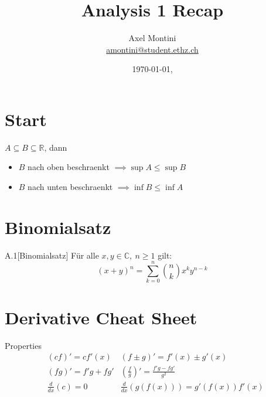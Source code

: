 \documentclass[8pt,a4paper,twocolumn,table]{extarticle}
\title{Analysis 1 Recap}
\author{Axel Montini \\ \href{mailto:amontini@student.ethz.ch}{amontini@student.ethz.ch}}
\date{\today \hfill \texttt{\branch}, \texttt{\commit}}
\newcommand{\R}{\mathbb{R}}
\newcommand{\C}{\mathbb{C}}
\begin{document}
\maketitle

\section{Start}

\begin{korollar}{1.16}
    \label{korollar:inf-sup}
    $A \subseteq B \subseteq \R$, dann
    \begin{itemize}
        \item $B$ nach oben beschraenkt $\implies \sup A \le \sup B$
        \item $B$ nach unten beschraenkt $\implies \inf B \le \inf A$
    \end{itemize}
\end{korollar}









\section{Binomialsatz}
\begin{satz}{A.1}[Binomialsatz]
    Für alle $x,y \in \C,\ n \ge 1$ gilt:
    \[ (x + y)^n = \sum_{k=0}^n \binom{n}{k} x^k y^{n - k} \]
\end{satz}

\section{Derivative Cheat Sheet}

Properties
\begin{alignat*}{2}
     & (cf)' = c f'(x)     & (f \pm g)' = f'(x) \pm g'(x)                       \\
     & (fg)' = f'g + fg'   & (\frac{f}{g})' = \frac{f'g - fg'}{g^2}             \\
     & \frac{d}{dx}(c) = 0 & \frac{d}{dx}\left( g(f(x)) \right) = g'(f(x))f'(x)
\end{alignat*}
\end{document}
